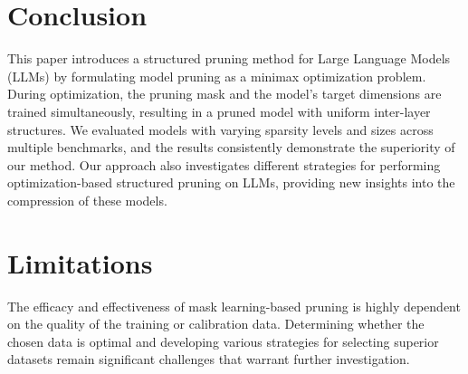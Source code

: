 \section{Conclusion}
This paper introduces a structured pruning method for Large Language Models (LLMs) by formulating model pruning as a minimax optimization problem. During optimization, the pruning mask and the model's target dimensions are trained simultaneously, resulting in a pruned model with uniform inter-layer structures. We evaluated models with varying sparsity levels and sizes across multiple benchmarks, and the results consistently demonstrate the superiority of our method. Our approach also investigates different strategies for performing optimization-based structured pruning on LLMs, providing new insights into the compression of these models.

\section{Limitations}
The efficacy and effectiveness of mask learning-based pruning is highly dependent on the quality of the training or calibration data. Determining whether the chosen data is optimal and developing various strategies for selecting superior datasets remain significant challenges that warrant further investigation. 

